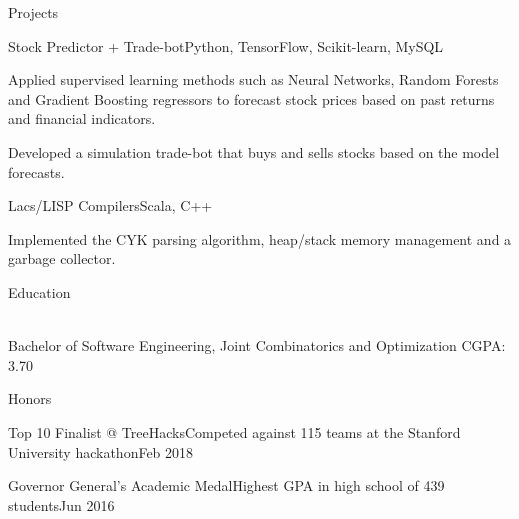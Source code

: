 \documentclass{resume} %
\begin{document}

\begin{rSection}{Projects}

\begin{projSec}{Stock Predictor + Trade-bot}{}{Python, TensorFlow, Scikit-learn, MySQL \href{https://github.com/UWCESEDUO/stock-prediction}{\space\faGithub}}
\item Applied supervised learning methods such as Neural Networks, Random Forests and Gradient Boosting regressors to forecast stock prices based on past returns and financial indicators.
\item Developed a simulation trade-bot that buys and sells stocks based on the model forecasts.
\end{projSec}

\begin{projSec}{Lacs/LISP Compilers}{}{Scala, C++ \href{https://github.com/jsun98/SchemePlusPlus}{\space\faGithub}}
\item Implemented the CYK parsing algorithm, heap/stack memory management and a garbage collector.
\end{projSec}

\end{rSection}



\begin{rSection}{Education}

\vspace{-1em}
\\ Bachelor of Software Engineering, Joint Combinatorics and Optimization \hfill {CGPA: 3.70 }

\end{rSection}


\begin{rSection}{Honors}

\begin{honorSec}{Top 10 Finalist @ TreeHacks}{Competed against 115 teams at the Stanford University hackathon}{Feb 2018}\end{honorSec}
\begin{honorSec}{Governor General's Academic Medal}{Highest GPA in high school of 439 students}{Jun 2016}\end{honorSec}
\vspace{1em} 

\end{rSection}
\end{document}
